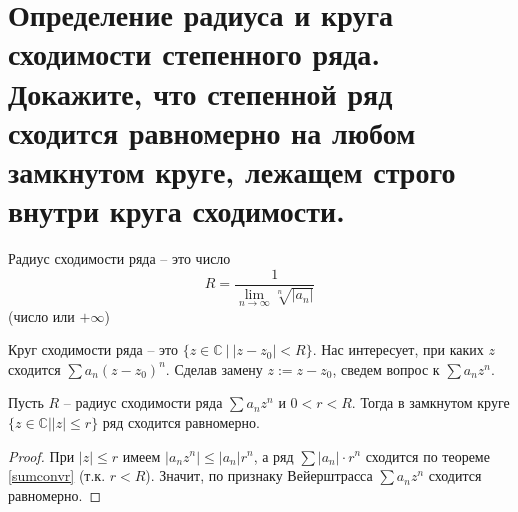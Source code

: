 \section{Определение радиуса и круга сходимости степенного ряда. Докажите, что степенной ряд сходится равномерно на любом замкнутом круге, лежащем строго внутри круга сходимости.}
\begin{definition}
    Радиус сходимости ряда -- это число $$R = \frac{1}{\lim_{n \to \infty} \sqrt[n]{|a_n|}}$$ (число или $+ \infty$)
\end{definition}
\begin{definition}
    Круг сходимости ряда -- это $\{z \in \mathbb{C} \> | \> |z - z_0| < R\}$.
    Нас интересует, при каких $z$ сходится $\sum a_n (z - z_0)^n$. Сделав замену $z := z - z_0$, сведем вопрос к $\sum a_n z^n$.
\end{definition}

\begin{theorem}
    Пусть $R$ -- радиус сходимости ряда $\sum a_n z^n$ и $0 < r < R$. Тогда в замкнутом круге $\{ z \in \mathbb{C} | |z| \leqslant r\}$ ряд сходится равномерно.
    \begin{proof}
        При $|z| \leqslant r$ имеем $|a_n z^n| \leqslant |a_n|r^n$, а ряд $\sum |a_n| \cdot r^n$ сходится по теореме \ref{sumconvr} (т.к. $r < R$). Значит, по признаку Вейерштрасса $\sum a_n z^n$ сходится равномерно.
    \end{proof}
\end{theorem}
